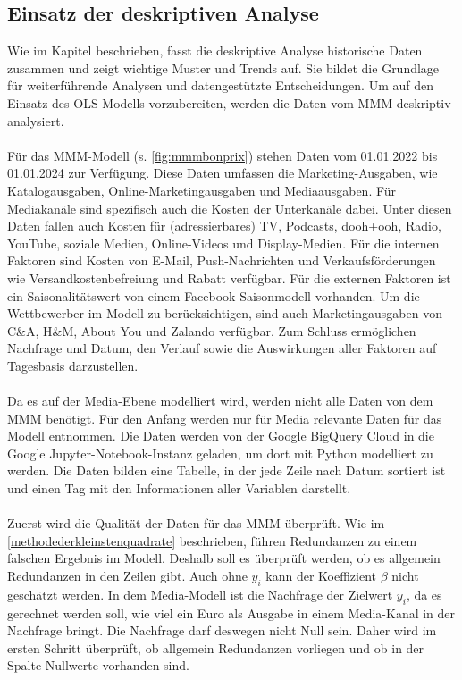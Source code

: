 \subsection{Einsatz der deskriptiven Analyse}
\label{EinsatzDerDeskriptivenAnalyse}
Wie im Kapitel  beschrieben, fasst die deskriptive Analyse historische Daten zusammen und zeigt wichtige Muster und Trends auf. Sie bildet die Grundlage für weiterführende Analysen und datengestützte Entscheidungen. Um auf den Einsatz des \ac{OLS}-Modells vorzubereiten, werden die Daten vom \ac{MMM} deskriptiv analysiert. \\\\
Für das \ac{MMM}-Modell (s. \autoref{fig:mmmbonprix}) stehen Daten vom 01.01.2022 bis 01.01.2024 zur Verfügung. Diese Daten umfassen die Marketing-Ausgaben, wie Katalogausgaben, Online-Marketingausgaben und Mediaausgaben. Für Mediakanäle sind spezifisch auch die Kosten der Unterkanäle dabei. 
Unter diesen Daten fallen auch Kosten für (adressierbares) TV, Podcasts, \ac{dooh}+\ac{ooh}, Radio, YouTube, soziale Medien, Online-Videos und Display-Medien. Für die internen Faktoren sind Kosten von E-Mail, Push-Nachrichten und Verkaufsförderungen wie Versandkostenbefreiung und Rabatt verfügbar. Für die externen Faktoren ist ein Saisonalitätswert von einem Facebook-Saisonmodell vorhanden. Um die Wettbewerber im Modell zu berücksichtigen, sind auch Marketingausgaben von C\&A, H\&M, About You und Zalando verfügbar. Zum Schluss ermöglichen Nachfrage und Datum, den Verlauf sowie die Auswirkungen aller Faktoren auf Tagesbasis darzustellen. \\\\
Da es auf der Media-Ebene modelliert wird, werden nicht alle Daten von dem \ac{MMM} benötigt. Für den Anfang werden nur für Media relevante Daten für das Modell entnommen. Die Daten werden von der Google BigQuery Cloud in die Google Jupyter-Notebook-Instanz geladen, um dort mit Python modelliert zu werden. Die Daten bilden eine Tabelle, in der jede Zeile nach Datum sortiert ist und einen Tag mit den Informationen aller Variablen darstellt. \\\\
Zuerst wird die Qualität der Daten für das \ac{MMM} überprüft. Wie im \autoref{methodederkleinstenquadrate} beschrieben, führen Redundanzen zu einem falschen Ergebnis im Modell. Deshalb soll es überprüft werden, ob es allgemein Redundanzen in den Zeilen gibt. Auch ohne \(y_i\) kann der Koeffizient $\beta$ nicht geschätzt werden. In dem Media-Modell ist die Nachfrage der Zielwert \(y_i\), da es gerechnet werden soll, wie viel ein Euro als Ausgabe in einem Media-Kanal in der Nachfrage bringt. Die Nachfrage darf deswegen nicht Null sein. Daher wird im ersten Schritt überprüft, ob allgemein Redundanzen vorliegen und ob in der Spalte  Nullwerte vorhanden sind.\\\\
